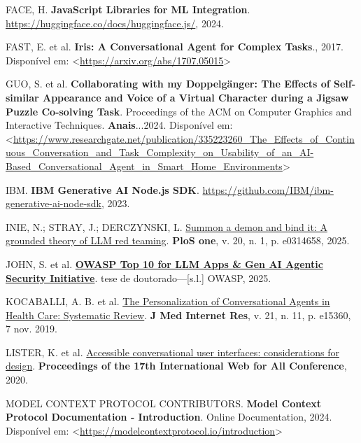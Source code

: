 \documentclass[
]{article}
\newlength{\cslhangindent}
\newenvironment{CSLReferences}[2] %
 {\begin{list}{}{%
  \setlength{\itemindent}{0pt}
  \setlength{\leftmargin}{0pt}
  \setlength{\parsep}{0pt}
  \ifodd #1
   \setlength{\leftmargin}{\cslhangindent}
   \setlength{\itemindent}{-1\cslhangindent}
  \fi
  \setlength{\itemsep}{#2\baselineskip}}}
 {\end{list}}
\begin{document}
\begin{CSLReferences}{0}{1}
FACE, H. \textbf{JavaScript Libraries for ML Integration}.
\url{https://huggingface.co/docs/huggingface.js/}, 2024.

FAST, E. et al. \textbf{Iris: A Conversational Agent for Complex
Tasks}., 2017. Disponível em:
\textless{}\url{https://arxiv.org/abs/1707.05015}\textgreater{}

GUO, S. et al. \textbf{Collaborating with my Doppelgänger: The Effects
of Self-similar Appearance and Voice of a Virtual Character during a
Jigsaw Puzzle Co-solving Task}. Proceedings of the ACM on Computer
Graphics and Interactive Techniques. \textbf{Anais}...2024. Disponível
em:
\textless{}\url{https://www.researchgate.net/publication/335223260_The_Effects_of_Continuous_Conversation_and_Task_Complexity_on_Usability_of_an_AI-Based_Conversational_Agent_in_Smart_Home_Environments}\textgreater{}

IBM. \textbf{IBM Generative AI Node.js SDK}.
\url{https://github.com/IBM/ibm-generative-ai-node-sdk}, 2023.

INIE, N.; STRAY, J.; DERCZYNSKI, L.
\href{https://journals.plos.org/plosone/article?id=10.1371/journal.pone.0314658}{Summon
a demon and bind it: A grounded theory of LLM red teaming}. \textbf{PloS
one}, v. 20, n. 1, p. e0314658, 2025.

JOHN, S. et al.
\textbf{\href{https://genai.owasp.org/llmrisk/llm01-prompt-injection}{OWASP
Top 10 for LLM Apps \& Gen AI Agentic Security Initiative}}. tese de
doutorado---{[}s.l.{]} OWASP, 2025.

KOCABALLI, A. B. et al. \href{https://doi.org/10.2196/15360}{The
Personalization of Conversational Agents in Health Care: Systematic
Review}. \textbf{J Med Internet Res}, v. 21, n. 11, p. e15360, 7 nov.
2019.

LISTER, K. et al.
\href{https://api.semanticscholar.org/CorpusID:218539971}{Accessible
conversational user interfaces: considerations for design}.
\textbf{Proceedings of the 17th International Web for All Conference},
2020.

MODEL CONTEXT PROTOCOL CONTRIBUTORS. \textbf{{Model Context Protocol
Documentation - Introduction}}. Online Documentation, 2024. Disponível
em:
\textless{}\url{https://modelcontextprotocol.io/introduction}\textgreater{}


\end{CSLReferences}
\end{document}

